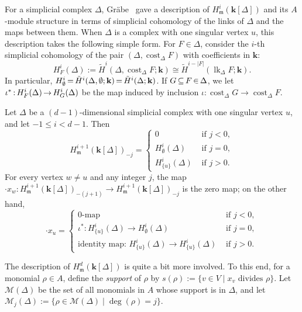 \documentclass[ALCO,ThmDefs,Unicode,epreuves]{cedram}
\DeclareMathOperator\lk{lk}
\DeclareMathOperator\cost{cost}
\newcommand{\field}{\mathbf{k}}
\newcommand{\M}{{\mathcal M}}
\newcommand{\mideal}{\ensuremath{\mathfrak{m}}}
\newcommand*{\Mk}{\mkern -2mu}
\begin{document}
For a simplicial complex $\Delta$, Gr{\"a}be~\cite{Grabe-84} gave a description of $H^i_\mideal(\field[\Delta])$ and its $A$-module structure in terms of simplicial cohomology of the links of $\Delta$ and the maps between them. When $\Delta$ is a complex with one singular vertex $u$, this description takes the following simple form. For $F\in\Delta$, consider the $i$-th simplicial cohomology of the pair $(\Delta, \cost_\Delta F)$ with coefficients in $\field$:
\[
H^i_F(\Delta):=\tilde{H}^i(\Delta, \cost_\Delta F; \field)\cong \tilde{H}^{i-|F|}(\lk_\Delta F; \field). \]
In particular, $H^i_\emptyset\Mk =\Mk \tilde{H}^i(\Delta, \emptyset;\field)\Mk =\Mk \tilde{H}^i(\Delta; \field)$. If $G\Mk \subseteq \Mk F\Mk \in\Mk \Delta$, we let $\iota^\ast\Mk :\Mk  H^i_F(\Delta)\Mk \to\Mk  H^i_G(\Delta)$ be the map induced by inclusion $\iota: \cost_\Delta G \to \cost_\Delta F$.

\begin{theorem}[Gr{\"a}be] \label{local-cohom-1-singul}
Let $\Delta$ be a $(d-1)$-dimensional simplicial complex with one singular vertex $u$, and let $-1\leq i <d-1$. Then
\[
H^{i+1}_\mideal(\field[\Delta])_{-j}=\begin{cases}
0 & \mbox{ if $j<0$},\\
H^i_\emptyset(\Delta) & \mbox{ if $j=0$},\\
H^i_{\{u\}}(\Delta) & \mbox{ if $j>0$}.
\end{cases}
\]
For every vertex $w\neq u$ and any integer $j$, the map $\cdot x_w: H^{i+1}_\mideal(\field[\Delta])_{-(j+1)} \to H^{i+1}_\mideal(\field[\Delta])_{-j}$ is the zero map; on the other hand, 
\[\cdot x_u= \begin{cases}
\mbox{$0$-map} & \mbox{ if $j<0$},\\
\iota^*: H^i_{\{u\}}(\Delta) \to H^i_\emptyset(\Delta) & \mbox{ if $j=0$},\\
\mbox{identity map: $H^i_{\{u\}}(\Delta) \to H^i_{\{u\}}(\Delta)$} & \mbox{ if $j>0$}.
\end{cases}
\]
\end{theorem}

The description of $H^d_\mideal(\field[\Delta])$ is quite a bit more involved. To this end, for a monomial $\rho\in A$, define the \emph{support} of $\rho$ by $s(\rho):=\{v\in V \mid x_v \mbox{ divides }\rho\}$. Let $\M(\Delta)$ be the set of all monomials in $A$ whose support is in $\Delta$, and let $\M_j(\Delta):=\{\rho\in\M(\Delta) \mid \deg(\rho)=j\}$.
\end{document}

